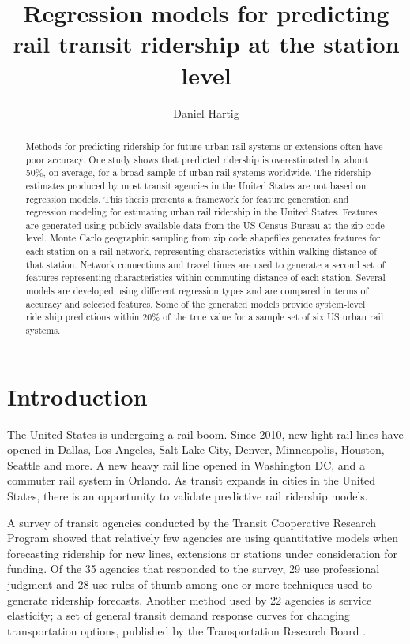 \documentclass[11pt]{article}
\title{Regression models for predicting rail transit ridership at the station level}
\author{Daniel Hartig}
\date{\vspace{-5ex}}
\begin{document}
\maketitle
\begin{abstract}
Methods for predicting ridership for future urban rail systems or extensions often have poor accuracy. One study shows that predicted ridership is overestimated by about 50\%, on average, for a broad sample of urban rail systems worldwide.  The ridership estimates produced by most transit agencies in the United States are not based on regression models. This thesis presents a framework for feature generation and regression modeling for estimating urban rail ridership in the  United States.  Features are generated using publicly available data from the US Census Bureau at the zip code level. Monte Carlo geographic sampling from zip code shapefiles generates features for each station on a rail network, representing characteristics within walking distance of that station. Network connections and travel times are used to generate a second set of features representing characteristics within commuting distance of each station. Several models are developed using different regression types and are compared in terms of accuracy and selected features. Some of the generated models provide system-level ridership predictions within 20\% of the true value for a sample set of six US urban rail systems. 
\end{abstract}

\section{Introduction}

The United States is undergoing a rail boom. Since 2010, new light rail lines have opened in Dallas, Los Angeles, Salt Lake City, Denver, Minneapolis, Houston, Seattle and more.  A new heavy rail line opened in Washington DC, and a commuter rail system in Orlando. As transit expands in cities in the United States, there is an opportunity to validate predictive rail ridership models. 

A survey of transit agencies \cite{Boyle2006} conducted by the Transit Cooperative Research Program showed that relatively few agencies are using quantitative models when forecasting ridership for new lines, extensions or stations under consideration for funding. Of the 35 agencies that responded to the survey, 29 use professional judgment and 28 use rules of thumb among one or more techniques used to generate ridership forecasts. Another method used by 22 agencies is service elasticity; a set of general transit demand response curves for changing transportation options, published by the Transportation Research Board \cite{tcrp95}. 
\end{document}
